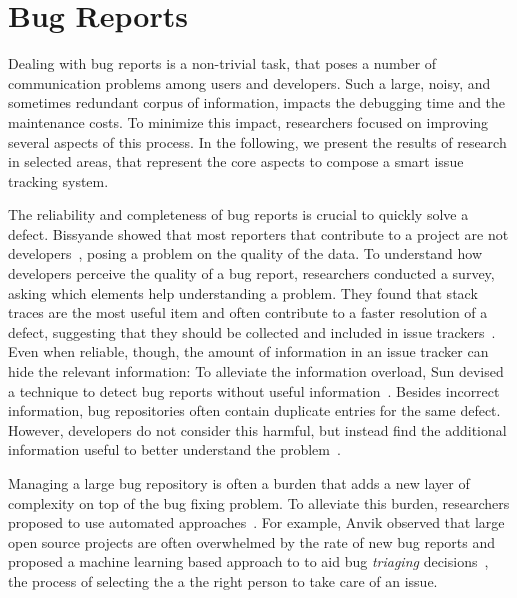 \section{Bug Reports}

Dealing with bug reports is a non-trivial task, that poses a number of communication problems among users and developers. Such a large, noisy, and sometimes redundant corpus of information, impacts the debugging time and the maintenance costs. To minimize this impact, researchers focused on improving several aspects of this process. In the following, we present the results of research in selected areas, that represent the core aspects to compose a smart issue tracking system.



The reliability and completeness of bug reports is crucial to quickly solve a defect. Bissyande \etal showed that most reporters that contribute to a project are not developers~\cite{Biss2013}, posing a problem on the quality of the data. To understand how developers perceive the quality of a bug report, researchers conducted a survey, asking which elements help understanding a problem. They found that stack traces are the most useful item and often contribute to a faster resolution of a defect, suggesting that they should be collected and included in issue trackers~\cite{Zimm2010a,Bett2007,Schr2010}. Even when reliable, though, the amount of information in an issue tracker can hide the relevant information: To alleviate the information overload, Sun devised a technique to detect bug reports without useful information~\cite{Sun2011}. Besides incorrect information, bug repositories often contain duplicate entries for the same defect. However, developers do not consider this harmful, but instead find the additional information useful to better understand the problem~\cite{Bett2008a}.

Managing a large bug repository is often a burden that adds a new layer of complexity on top of the bug fixing problem. To alleviate this burden, researchers proposed to use automated approaches~\cite{Weim2006}. For example, Anvik \etal observed that large open source projects are often overwhelmed by the rate of new bug reports and proposed a machine learning based approach to to aid bug \emph{triaging} decisions~\cite{Anvi2006a}, the process of selecting the a the right person to take care of an issue.


